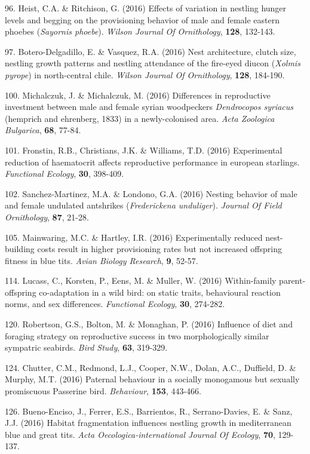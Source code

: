 96. Heist, C.A. \&  Ritchison, G. (2016) Effects of variation in nestling hunger levels and begging on the provisioning behavior of male and female eastern phoebes (\textit{Sayornis phoebe}). \textit{Wilson Journal Of Ornithology},  \textbf{128}, 132-143.

97. Botero-Delgadillo, E. \&  Vasquez, R.A. (2016) Nest architecture, clutch size, nestling growth patterns and nestling attendance of the fire-eyed diucon (\textit{Xolmis pyrope}) in north-central chile. \textit{Wilson Journal Of Ornithology},  \textbf{128}, 184-190.

100. Michalczuk, J. \&  Michalczuk, M. (2016) Differences in reproductive investment between male and female syrian woodpeckers \textit{Dendrocopos syriacus} (hemprich and ehrenberg, 1833) in a newly-colonised area. \textit{Acta Zoologica Bulgarica},  \textbf{68}, 77-84.

101. Fronstin, R.B., Christians, J.K. \&  Williams, T.D. (2016) Experimental reduction of haematocrit affects reproductive performance in european starlings. \textit{Functional Ecology},  \textbf{30}, 398-409.

102. Sanchez-Martinez, M.A. \&  Londono, G.A. (2016) Nesting behavior of male and female undulated antshrikes (\textit{Frederickena unduliger}). \textit{Journal Of Field Ornithology},  \textbf{87}, 21-28.

105. Mainwaring, M.C. \&  Hartley, I.R. (2016) Experimentally reduced nest-building costs result in higher provisioning rates but not increased offspring fitness in blue tits. \textit{Avian Biology Research},  \textbf{9}, 52-57.

114. Lucass, C., Korsten, P., Eens, M. \&  Muller, W. (2016) Within-family parent-offspring co-adaptation in a wild bird: on static traits, behavioural reaction norms, and sex differences. \textit{Functional Ecology},  \textbf{30}, 274-282.

120. Robertson, G.S., Bolton, M. \&  Monaghan, P. (2016) Influence of diet and foraging strategy on reproductive success in two morphologically similar sympatric seabirds. \textit{Bird Study},  \textbf{63}, 319-329.

124. Chutter, C.M., Redmond, L.J., Cooper, N.W., Dolan, A.C., Duffield, D. \&  Murphy, M.T. (2016) Paternal behaviour in a socially monogamous but sexually promiscuous Passerine bird. \textit{Behaviour},  \textbf{153}, 443-466.

126. Bueno-Enciso, J., Ferrer, E.S., Barrientos, R., Serrano-Davies, E. \&  Sanz, J.J. (2016) Habitat fragmentation influences nestling growth in mediterranean blue and great tits. \textit{Acta Oecologica-international Journal Of Ecology},  \textbf{70}, 129-137.


